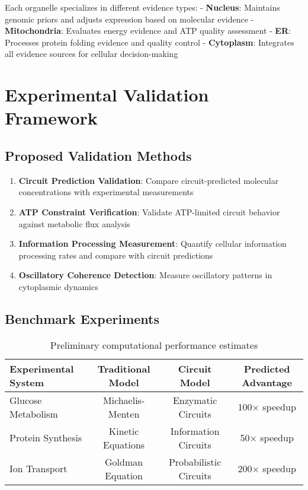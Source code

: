 \documentclass[12pt,a4paper]{article}
\begin{document}
Each organelle specializes in different evidence types:
- \textbf{Nucleus}: Maintains genomic priors and adjusts expression based on molecular evidence
- \textbf{Mitochondria}: Evaluates energy evidence and ATP quality assessment
- \textbf{ER}: Processes protein folding evidence and quality control
- \textbf{Cytoplasm}: Integrates all evidence sources for cellular decision-making

\section{Experimental Validation Framework}

\subsection{Proposed Validation Methods}

\begin{enumerate}
\item \textbf{Circuit Prediction Validation}: Compare circuit-predicted molecular concentrations with experimental measurements
\item \textbf{ATP Constraint Verification}: Validate ATP-limited circuit behavior against metabolic flux analysis
\item \textbf{Information Processing Measurement}: Quantify cellular information processing rates and compare with circuit predictions
\item \textbf{Oscillatory Coherence Detection}: Measure oscillatory patterns in cytoplasmic dynamics
\end{enumerate}

\subsection{Benchmark Experiments}

\begin{table}[H]
\centering
\begin{tabular}{lccc}
\toprule
Experimental System & Traditional Model & Circuit Model & Predicted Advantage \\
\midrule
Glucose Metabolism & Michaelis-Menten & Enzymatic Circuits & 100× speedup \\
Protein Synthesis & Kinetic Equations & Information Circuits & 50× speedup \\
Ion Transport & Goldman Equation & Probabilistic Circuits & 200× speedup \\
\bottomrule
\end{tabular}
\caption{Preliminary computational performance estimates}
\end{table}
\end{document}
